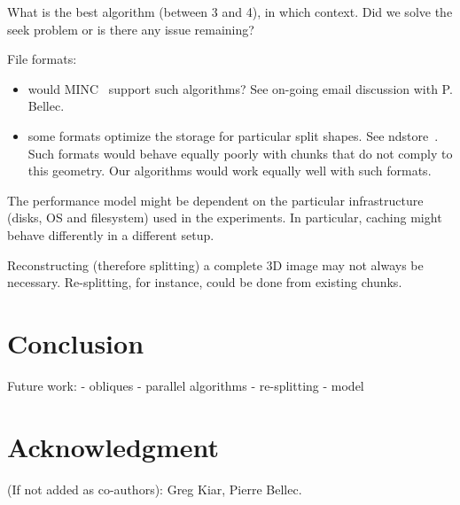 \documentclass[10pt, conference, compsocconf]{IEEEtran}
\begin{document}
What is the best algorithm (between 3 and 4), in which context. Did we
solve the seek problem or is there any issue remaining?

File formats:
\begin{itemize}
\item would MINC~\cite{vincent2016minc} support such algorithms? See on-going email discussion
with P. Bellec.
\item some formats optimize the storage for particular split shapes. See
  ndstore~\cite{burns2013open}. Such formats would behave equally
  poorly with chunks that do not comply to this geometry. Our
  algorithms would work equally well with such formats.
\end{itemize}

The performance model might be dependent on the particular
infrastructure (disks, OS and filesystem) used in the experiments. In
particular, caching might behave differently in a different setup.

Reconstructing (therefore splitting) a complete 3D image may not
always be necessary. Re-splitting, for instance, could be done from
existing chunks.

\section{Conclusion}

Future work:
- obliques
- parallel algorithms
- re-splitting
- model

\section*{Acknowledgment}

(If not added as co-authors): Greg Kiar, Pierre Bellec.



\end{document}
